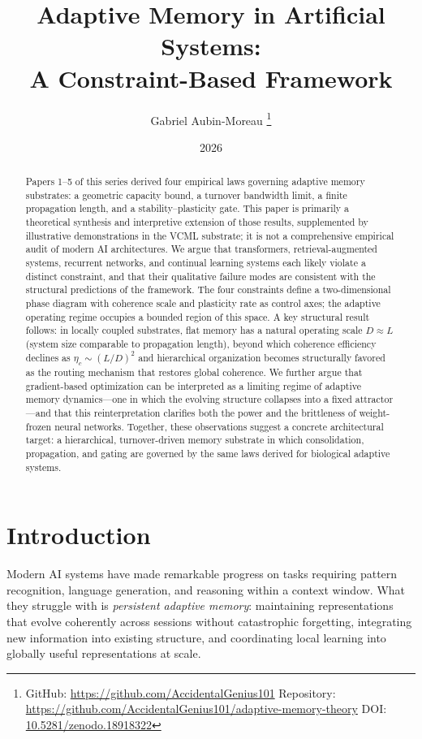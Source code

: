 \documentclass[12pt]{article}
\title{Adaptive Memory in Artificial Systems:\\
A Constraint-Based Framework}
\author{Gabriel Aubin-Moreau%
  \thanks{GitHub: \url{https://github.com/AccidentalGenius101} \quad
    Repository: \url{https://github.com/AccidentalGenius101/adaptive-memory-theory} \quad DOI: \href{https://doi.org/10.5281/zenodo.18918322}{10.5281/zenodo.18918322}}}
\date{2026}
\begin{document}
\maketitle

\begin{abstract}
Papers 1--5 of this series derived four empirical laws governing adaptive memory substrates: a geometric capacity bound, a turnover bandwidth limit, a finite propagation length, and a stability--plasticity gate. This paper is primarily a theoretical synthesis and interpretive extension of those results, supplemented by illustrative demonstrations in the VCML substrate; it is not a comprehensive empirical audit of modern AI architectures. We argue that transformers, retrieval-augmented systems, recurrent networks, and continual learning systems each likely violate a distinct constraint, and that their qualitative failure modes are consistent with the structural predictions of the framework. The four constraints define a two-dimensional phase diagram with coherence scale and plasticity rate as control axes; the adaptive operating regime occupies a bounded region of this space. A key structural result follows: in locally coupled substrates, flat memory has a natural operating scale $D \approx L$ (system size comparable to propagation length), beyond which coherence efficiency declines as $\eta_c \sim (L/D)^2$ and hierarchical organization becomes structurally favored as the routing mechanism that restores global coherence. We further argue that gradient-based optimization can be interpreted as a limiting regime of adaptive memory dynamics---one in which the evolving structure collapses into a fixed attractor---and that this reinterpretation clarifies both the power and the brittleness of weight-frozen neural networks. Together, these observations suggest a concrete architectural target: a hierarchical, turnover-driven memory substrate in which consolidation, propagation, and gating are governed by the same laws derived for biological adaptive systems.
\end{abstract}

\tableofcontents
\newpage

\section{Introduction}
\label{sec:intro}

Modern AI systems have made remarkable progress on tasks requiring pattern recognition, language generation, and reasoning within a context window. What they struggle with is \emph{persistent adaptive memory}: maintaining representations that evolve coherently across sessions without catastrophic forgetting, integrating new information into existing structure, and coordinating local learning into globally useful representations at scale.
\end{document}
